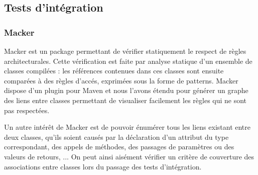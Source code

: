\subsection{Tests d'int\'egration}
  
\subsubsection{Macker}
  
     Macker est un package permettant de v\'erifier statiquement le
     respect de r\`egles architecturales. Cette v\'erification est
     faite par analyse statique d'un ensemble de classes compil\'ees
     : les r\'ef\'erences contenues dans ces classes sont ensuite
     compar\'ees \`a des r\`egles d'acc\'es, exprim\'ees sous la
     forme de  patterns. Macker dispose d'un  plugin pour Maven et
     nous l'avons \'etendu pour g\'en\'erer un graphe des liens
     entre classes permettant de visualiser facilement les r\`egles
     qui ne sont pas respect\'ees.
    
\par
  
Un autre int\'er\^et de Macker est de pouvoir \'enum\'erer tous
     les liens existant entre deux classes, qu'ils soient caus\'es
     par la d\'eclaration d'un attribut du type correspondant,
     des appels de m\'ethodes, des passages de param\`etres ou des
     valeurs de retours, ... On peut ainsi ais\'ement v\'erifier un
     crit\`ere de couverture des associations entre classes lors du
     passage des tests d'int\'egration.

\par
   
